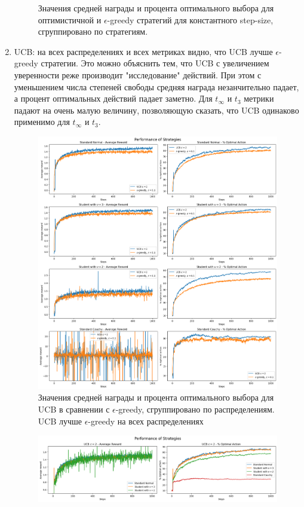 \documentclass{article}
\begin{document}
\begin{enumerate}
\begin{figure}[t]
        \caption{\label{fig:optimistic_2}Значения средней награды и процента оптимального выбора для оптимистичной и $\epsilon$-greedy стратегий для константного step-size, сгруппировано по стратегиям.}
    \end{figure}
    \item UCB: на всех распределениях и всех метриках видно, что UCB лучше $\epsilon$-greedy стратегии. Это можно объяснить тем, что UCB с увеличением уверенности реже производит "исследование" действий. При этом с уменьшением числа степеней свободы средняя награда незанчительно падает, а процент оптимальных действий падает заметно. Для $t_{\infty}$ и $t_3$ метрики падают на очень малую величину, позволяющую сказать, что UCB одинаково применимо для $t_{\infty}$ и $t_3$.
    \begin{figure}
        \centering
        \includegraphics[width=1.1\linewidth]{ucb_1.png}
        \caption{\label{fig:ucb_1}Значения средней награды и процента оптимального выбора для UCB в сравнении с $\epsilon$-greedy, сгруппировано по распределениям. UCB лучше $\epsilon$-greedy на всех распределениях}
    \end{figure}
    \begin{figure}[t]
        \includegraphics[width=1.1\linewidth]{ucb_2.png}

\end{figure}
\end{enumerate}
\end{document}
